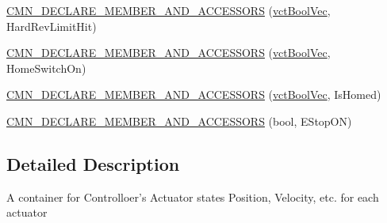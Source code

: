 {\bf }\par
\begin{DoxyCompactItemize}
\item 
\hyperlink{classprm_actuator_state_ab396299b1db637d900e1f53193e00683}{C\-M\-N\-\_\-\-D\-E\-C\-L\-A\-R\-E\-\_\-\-M\-E\-M\-B\-E\-R\-\_\-\-A\-N\-D\-\_\-\-A\-C\-C\-E\-S\-S\-O\-R\-S} (\hyperlink{vct_dynamic_vector_types_8h_aeb2237c134aee3769198bd9d55c8a9e0}{vct\-Bool\-Vec}, Hard\-Rev\-Limit\-Hit)
\end{DoxyCompactItemize}

{\bf }\par
\begin{DoxyCompactItemize}
\item 
\hyperlink{classprm_actuator_state_ab1d3a692904209cce8a864cb0b941d65}{C\-M\-N\-\_\-\-D\-E\-C\-L\-A\-R\-E\-\_\-\-M\-E\-M\-B\-E\-R\-\_\-\-A\-N\-D\-\_\-\-A\-C\-C\-E\-S\-S\-O\-R\-S} (\hyperlink{vct_dynamic_vector_types_8h_aeb2237c134aee3769198bd9d55c8a9e0}{vct\-Bool\-Vec}, Home\-Switch\-On)
\end{DoxyCompactItemize}

{\bf }\par
\begin{DoxyCompactItemize}
\item 
\hyperlink{classprm_actuator_state_a5526cdcc55fd6e7eea716dbda68c62ae}{C\-M\-N\-\_\-\-D\-E\-C\-L\-A\-R\-E\-\_\-\-M\-E\-M\-B\-E\-R\-\_\-\-A\-N\-D\-\_\-\-A\-C\-C\-E\-S\-S\-O\-R\-S} (\hyperlink{vct_dynamic_vector_types_8h_aeb2237c134aee3769198bd9d55c8a9e0}{vct\-Bool\-Vec}, Is\-Homed)
\end{DoxyCompactItemize}

{\bf }\par
\begin{DoxyCompactItemize}
\item 
\hyperlink{classprm_actuator_state_aa58234ef96820600c77675818235e424}{C\-M\-N\-\_\-\-D\-E\-C\-L\-A\-R\-E\-\_\-\-M\-E\-M\-B\-E\-R\-\_\-\-A\-N\-D\-\_\-\-A\-C\-C\-E\-S\-S\-O\-R\-S} (bool, E\-Stop\-O\-N)
\end{DoxyCompactItemize}



\subsection{Detailed Description}
A container for Controlloer's Actuator states Position, Velocity, etc. for each actuator 

